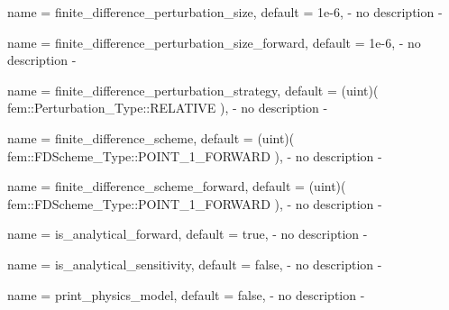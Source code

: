 \begin{parameter}{
    name    = {finite_difference_perturbation_size},
    default = {1e-6},
}
- no description -
\end{parameter}

\begin{parameter}{
    name    = {finite_difference_perturbation_size_forward},
    default = {1e-6},
}
- no description -
\end{parameter}

\begin{parameter}{
    name    = {finite_difference_perturbation_strategy},
    default = {(uint)( fem::Perturbation_Type::RELATIVE )},
}
- no description -
\end{parameter}

\begin{parameter}{
    name    = {finite_difference_scheme},
    default = {(uint)( fem::FDScheme_Type::POINT_1_FORWARD )},
}
- no description -
\end{parameter}

\begin{parameter}{
    name    = {finite_difference_scheme_forward},
    default = {(uint)( fem::FDScheme_Type::POINT_1_FORWARD )},
}
- no description -
\end{parameter}

\begin{parameter}{
    name    = {is_analytical_forward},
    default = {true},
}
- no description -
\end{parameter}

\begin{parameter}{
    name    = {is_analytical_sensitivity},
    default = {false},
}
- no description -
\end{parameter}

\begin{parameter}{
    name    = {print_physics_model},
    default = {false},
}
- no description -
\end{parameter}

